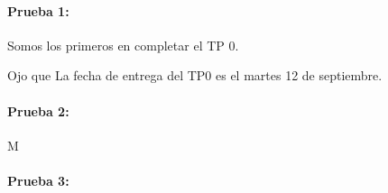 \documentclass[a4paper]{article}
\begin{document}
\paragraph{Prueba 1:}

Somos los primeros en completar el TP 0.

Ojo que La fecha de entrega del TP0 es el martes 12 de septiembre.

\paragraph{Prueba 2:}

M

\paragraph{Prueba 3:} 
\end{document}
